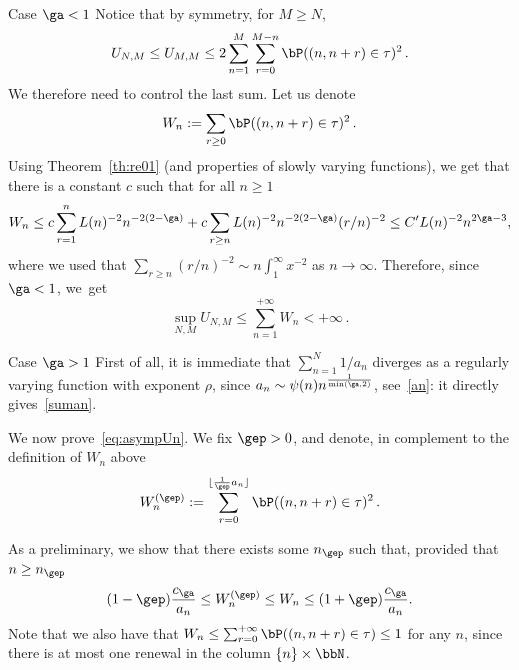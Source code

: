 \begin{appendix}
\begin{proofc}

\begin{step}{Case $\ga<1$}
Notice that by symmetry, for $M\geq N$,
\[
U_{N,M} \leq U_{M,M} \leq 2 \sum_{n=1}^M \sum_{r=0}^{M-n} \bP((n,n+r) \in\tau)^2\,.
\]
We therefore need to control the last sum. Let us denote
\[
W_n:=\sum_{r\geq 0} \bP((n,n+r) \in\tau)^2\,.
\]
Using Theorem~\ref{th:re01} (and properties of slowly varying functions), we get that there is a constant $c$ such that for all $n\geq 1$
\begin{align*}
W_n \leq c\sum_{r=1}^n L(n)^{-2} n^{-2(2-\ga)} + c\sum_{r\geq n} L(n)^{-2} n^{-2(2-\ga)} (r/n)^{-2}
\leq C' L(n)^{-2} n^{ 2\ga -3},
\end{align*}
where we used that $\sum_{r\geq n} (r/n)^{-2} \sim n \int_1^{\infty} x^{-2}$ as $n\to\infty$. Therefore, since $\ga<1$, we~get
\[
\sup_{N,M} U_{N,M} \leq \sum_{n=1}^{+\infty} W_n <+\infty\,.
\]
\end{step}

\begin{step}{Case $\ga > 1$}
First of all, it is immediate that $\sum_{n=1}^N 1/a_n$ diverges as a regularly varying function with exponent $\rho$, since $a_n \sim \psi(n) n^{\frac{1}{\min(\ga,2)}}$, see~\eqref{an}: it directly gives~\eqref{suman}.



We now prove~\eqref{eq:asympUn}. We fix $\gep>0$, and denote, in complement to the definition of $W_n$ above
\[
W_n^{(\gep)} := \sum_{r = 0}^{\lfloor \frac1\gep a_n \rfloor} \bP((n,n+r) \in \tau)^2\,.
\]


As a preliminary, we show that there exists some $n_\gep$ such that, provided that~$n\geq n_{\gep}$
\begin{equation}\label{eq:sumk}
(1-\gep) \frac{c_{\ga}}{a_n} \leq W_n^{(\gep)} \leq W_n \leq (1+\gep) \frac{c_{\ga}}{a_n}.
\end{equation}
Note that we also have that $W_n \leq \sum_{r = 0}^{+\infty} \bP((n,n+r) \in \tau) \leq 1$ for any $n$, since there is at most one renewal in the column $\{n\}\times \bbN$.



\end{step}
\end{proofc}
\end{appendix}

